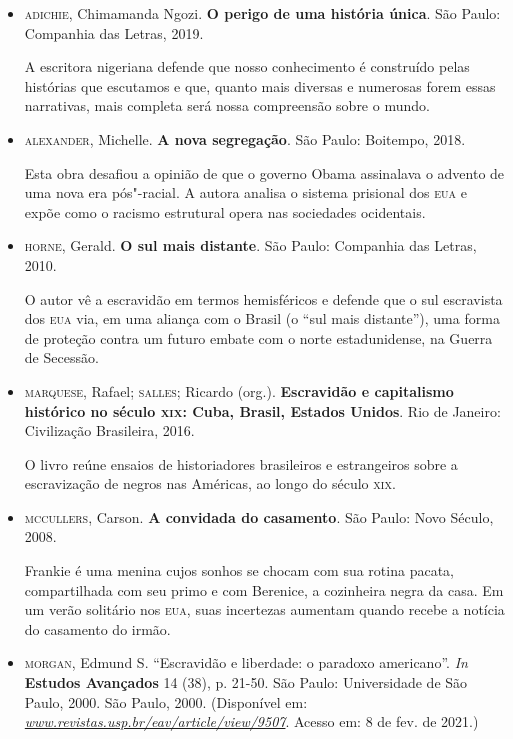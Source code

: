 \documentclass[12pt]{extarticle}
\begin{document}
\begin{itemize}
\item\textsc{adichie}, Chimamanda Ngozi. \textbf{O perigo de uma história única}.
  São Paulo: Companhia das Letras, 2019.

A escritora nigeriana defende que nosso conhecimento é construído pelas
histórias que escutamos e que, quanto mais diversas e numerosas forem
essas narrativas, mais completa será nossa compreensão sobre o mundo.

\item\textsc{alexander}, Michelle. \textbf{A nova segregação}. São Paulo: Boitempo,
  2018.

Esta obra desafiou a opinião de que o governo Obama assinalava o advento
de uma nova era pós"-racial. A autora analisa o sistema prisional dos \textsc{eua}
e expõe como o racismo estrutural opera nas sociedades ocidentais.

\item\textsc{horne}, Gerald. \textbf{O sul mais distante}. São Paulo: Companhia das
  Letras, 2010.

O autor vê a escravidão em termos hemisféricos e defende que o sul
escravista dos \textsc{eua} via, em uma aliança com o Brasil (o ``sul mais
distante''), uma forma de proteção contra um futuro embate com o norte
estadunidense, na Guerra de Secessão.

\item\textsc{marquese}, Rafael; \textsc{salles}; Ricardo (org.). \textbf{Escravidão e
  capitalismo histórico no século \textsc{xix}: Cuba, Brasil, Estados Unidos}.
  Rio de Janeiro: Civilização Brasileira, 2016.

O livro reúne ensaios de historiadores brasileiros e estrangeiros sobre
a escravização de negros nas Américas, ao longo do século \textsc{xix}.

\item\textsc{mccullers}, Carson. \textbf{A convidada do casamento}. São Paulo: Novo
  Século, 2008.

Frankie é uma menina cujos sonhos se chocam com sua rotina pacata,
compartilhada com seu primo e com Berenice, a cozinheira negra da casa.
Em um verão solitário nos \textsc{eua}, suas incertezas aumentam quando recebe a
notícia do casamento do irmão.

\item\textsc{morgan}, Edmund S. ``Escravidão e liberdade: o paradoxo americano''.
  \emph{In} \textbf{Estudos Avançados} 14 (38), p. 21-50. São Paulo:
  Universidade de São Paulo, 2000. São Paulo, 2000. (Disponível em:
  \href{http://www.revistas.usp.br/eav/article/view/9507}{\emph{www.revistas.usp.br/eav/article/view/9507}}.
  Acesso em: 8 de fev. de 2021.)


\end{itemize}
\end{document}
